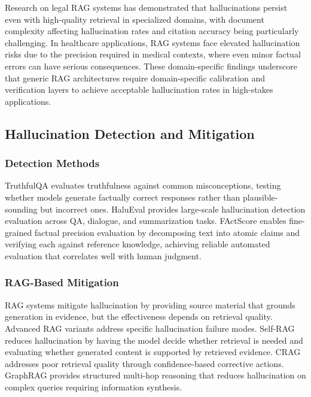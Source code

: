 \documentclass[11pt,letterpaper]{article}
\begin{document}
Research on legal RAG systems has demonstrated that hallucinations persist even with high-quality retrieval in specialized domains, with document complexity affecting hallucination rates and citation accuracy being particularly challenging. In healthcare applications, RAG systems face elevated hallucination risks due to the precision required in medical contexts, where even minor factual errors can have serious consequences. These domain-specific findings underscore that generic RAG architectures require domain-specific calibration and verification layers to achieve acceptable hallucination rates in high-stakes applications.

\subsection{Hallucination Detection and Mitigation}

\subsubsection{Detection Methods}

TruthfulQA \cite{lin2022truthfulqa} evaluates truthfulness against common misconceptions, testing whether models generate factually correct responses rather than plausible-sounding but incorrect ones. HaluEval \cite{li2023halueval} provides large-scale hallucination detection evaluation across QA, dialogue, and summarization tasks. FActScore \cite{min2023factscore} enables fine-grained factual precision evaluation by decomposing text into atomic claims and verifying each against reference knowledge, achieving reliable automated evaluation that correlates well with human judgment.

\subsubsection{RAG-Based Mitigation}

RAG systems mitigate hallucination by providing source material that grounds generation in evidence, but the effectiveness depends on retrieval quality. Advanced RAG variants address specific hallucination failure modes. Self-RAG \cite{asai2024selfrag} reduces hallucination by having the model decide whether retrieval is needed and evaluating whether generated content is supported by retrieved evidence. CRAG \cite{yan2024corrective} addresses poor retrieval quality through confidence-based corrective actions. GraphRAG provides structured multi-hop reasoning that reduces hallucination on complex queries requiring information synthesis.
\end{document}

